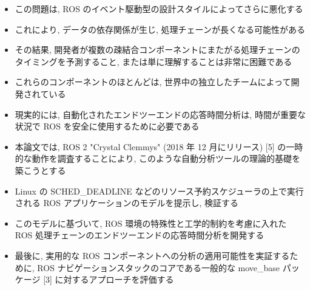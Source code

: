 \begin{frame}{}
    \begin{itemize}
        \item この問題は, ROS のイベント駆動型の設計スタイルによってさらに悪化する
        \item これにより, データの依存関係が生じ, 処理チェーンが長くなる可能性がある
        \item その結果, 開発者が複数の疎結合コンポーネントにまたがる処理チェーンのタイミングを予測すること, または単に理解することは非常に困難である
        \item これらのコンポーネントのほとんどは, 世界中の独立したチームによって開発されている
        \item 現実的には, 自動化されたエンドツーエンドの応答時間分析は, 時間が重要な状況で ROS を安全に使用するために必要である
    \end{itemize}
\end{frame}


\begin{frame}{}
    \begin{itemize}
        \item 本論文では, ROS 2 "Crystal Clemmys" (2018 年 12 月にリリース) [5] の一時的な動作を調査することにより, このような自動分析ツールの理論的基礎を築こうとする
        \item Linux の SCHED\_DEADLINE などのリソース予約スケジューラの上で実行される ROS アプリケーションのモデルを提示し, 検証する
        \item このモデルに基づいて, ROS 環境の特殊性と工学的制約を考慮に入れた ROS 処理チェーンのエンドツーエンドの応答時間分析を開発する
        \item 最後に, 実用的な ROS コンポーネントへの分析の適用可能性を実証するために, ROS ナビゲーションスタックのコアである一般的な move\_base パッケージ [3] に対するアプローチを評価する
    \end{itemize}
\end{frame}
